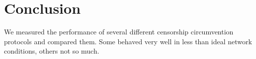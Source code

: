 
\chapter{Conclusion}

We measured the performance of several different censorship circumvention protocols and compared them. Some behaved very well in less than ideal network conditions, others not so much.
